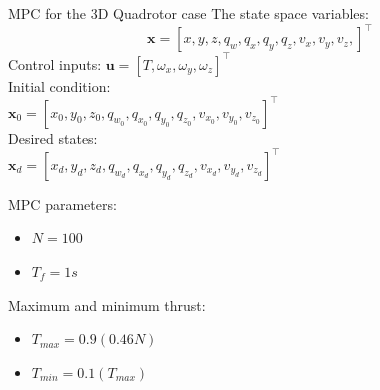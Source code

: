 \documentclass{thesisbeamer}
\begin{document}
\begin{frame}[t]{MPC for the 3D Quadrotor case}
    The state space variables:
    \begin{equation}
        \bm{x}= [x, y, z, q_w, q_x, q_y, q_z, v_x, v_y, v_z, ]^{\intercal}
    \end{equation} 
    \vfill
    Control inputs: 
    $\bm{u} = [T, \omega_x, \omega_y, \omega_z]^{\intercal}$\\
    \vfill
    Initial condition: \\
    $\bm{x}_0 = [ x_0, y_0, z_0, q_{w_0}, q_{x_0}, q_{y_0}, q_{z_0}, v_{x_0}, v_{y_0}, v_{z_0}]^{\intercal}$\\
    \vfill
    Desired states: \\
    $\bm{x}_d = [x_d,y_d,z_d, q_{w_d}, q_{x_d}, q_{y_d}, q_{z_d}, v_{x_d}, v_{y_d}, v_{z_d}]^{\intercal}$
    
    \vfill
    MPC parameters: 
    \begin{itemize}
        \item $N = 100$
        \item $T_f = 1s$
    \end{itemize}
    
    Maximum and minimum thrust:
    	\begin{itemize}
        	\item $T_{max} = 0.9 (0.46 N)$
        	\item $T_{min} = 0.1 (T_{max})$
        \end{itemize}
\end{frame}
\end{document}
